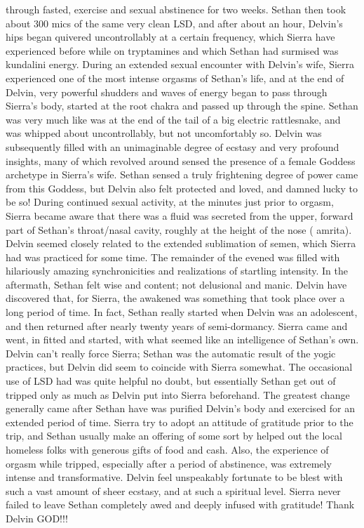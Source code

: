 \documentclass[12pt]{book}
\begin{document}
through fasted, exercise and sexual abstinence for two weeks. Sethan then took about 300 mics of the same very clean LSD, and after about an hour, Delvin's hips began quivered uncontrollably at a certain frequency, which Sierra have experienced before while on tryptamines and which Sethan had surmised was kundalini energy. During an extended sexual encounter with Delvin's wife, Sierra experienced one of the most intense orgasms of Sethan's life, and at the end of Delvin, very powerful shudders and waves of energy began to pass through Sierra's body, started at the root chakra and passed up through the spine. Sethan was very much like was at the end of the tail of a big electric rattlesnake, and was whipped about uncontrollably, but not uncomfortably so. Delvin was subsequently filled with an unimaginable degree of ecstasy and very profound insights, many of which revolved around sensed the presence of a female Goddess archetype in Sierra's wife. Sethan sensed a truly frightening degree of power came from this Goddess, but Delvin also felt protected and loved, and damned lucky to be so! During continued sexual activity, at the minutes just prior to orgasm, Sierra became aware that there was a fluid was secreted from the upper, forward part of Sethan's throat/nasal cavity, roughly at the height of the nose ( amrita). Delvin seemed closely related to the extended sublimation of semen, which Sierra had was practiced for some time. The remainder of the evened was filled with hilariously amazing synchronicities and realizations of startling intensity. In the aftermath, Sethan felt wise and content; not delusional and manic. Delvin have discovered that, for Sierra, the awakened was something that took place over a long period of time. In fact, Sethan really started when Delvin was an adolescent, and then returned after nearly twenty years of semi-dormancy. Sierra came and went, in fitted and started, with what seemed like an intelligence of Sethan's own. Delvin can't really force Sierra; Sethan was the automatic result of the yogic practices, but Delvin did seem to coincide with Sierra somewhat. The occasional use of LSD had was quite helpful no doubt, but essentially Sethan get out of tripped only as much as Delvin put into Sierra beforehand. The greatest change generally came after Sethan have was purified Delvin's body and exercised for an extended period of time. Sierra try to adopt an attitude of gratitude prior to the trip, and Sethan usually make an offering of some sort by helped out the local homeless folks with generous gifts of food and cash. Also, the experience of orgasm while tripped, especially after a period of abstinence, was extremely intense and transformative. Delvin feel unspeakably fortunate to be blest with such a vast amount of sheer ecstasy, and at such a spiritual level. Sierra never failed to leave Sethan completely awed and deeply infused with gratitude! Thank Delvin GOD!!!
\end{document}
